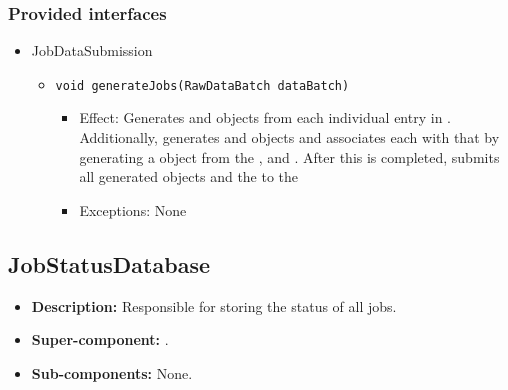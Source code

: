 \subsubsection*{Provided interfaces}
\begin{itemize}
	\item JobDataSubmission
	\begin{itemize}
		\item \texttt{void generateJobs(RawDataBatch dataBatch)}
		\begin{itemize}
			\item Effect: Generates  and  objects from each individual entry in . Additionally, generates  and  objects and associates each  with that  by generating a  object from the ,  and . After this is completed, submits all generated  objects and the  to the 
			\item Exceptions: None
		\end{itemize}
	\end{itemize}
\end{itemize}

\subsection{JobStatusDatabase}
\begin{itemize}
    \item \textbf{Description:} Responsible for storing the status of all jobs.
    \item \textbf{Super-component:} .
    \item \textbf{Sub-components:} None.
\end{itemize}


